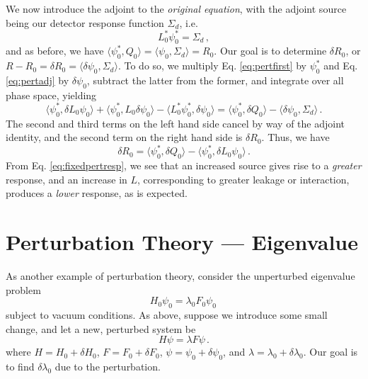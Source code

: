 We now introduce the adjoint to the \textit{original equation}, with the adjoint source being our detector response function $\Sigma_d$, i.e.
\begin{equation}
 L^*_0 \psi^*_0 = \Sigma_d \, ,
 \label{eq:pertadj}
\end{equation}
and as before, we have $\langle \psi^*_0, Q_0 \rangle =  \langle \psi_0, \Sigma_d \rangle = R_0$.  Our goal is to determine $\delta R_0$, or $R-R_0 = \delta R_0 =  \langle \delta \psi_0, \Sigma_d \rangle$.  To do so, we multiply Eq. \ref{eq:pertfirst} by $\psi^*_0$ and Eq. \ref{eq:pertadj} by $\delta \psi_0$, subtract the latter from the former, and integrate over all phase space, yielding
\begin{equation}
  \langle \psi^*_0, \delta L_0 \psi_0 \rangle + \langle \psi^*_0, L_0 \delta \psi_0 \rangle - \langle L^*_0 \psi^*_0, \delta \psi_0 \rangle = \langle \psi^*_0, \delta Q_0 \rangle - \langle \delta \psi_0, \Sigma_d \rangle \, .
\end{equation}
The second and third terms on the left hand side cancel by way of the adjoint identity, and the second term on the right hand side is $\delta R_0$.  Thus, we have
\begin{equation}
 \delta R_0 = \langle \psi^*_0, \delta Q_0 \rangle - \langle \psi^*_0, \delta L_0 \psi_0 \rangle \, .
 \label{eq:fixedpertresp}
\end{equation}
From Eq. \ref{eq:fixedpertresp}, we see that an increased source gives rise to a \textit{greater} response, and an increase in $L$, corresponding to greater leakage or interaction, produces a \textit{lower} response, as is expected.

\section*{Perturbation Theory --- Eigenvalue}

As another example of perturbation theory, consider the unperturbed eigenvalue problem
\begin{equation}
 H_0 \psi_0 = \lambda_0 F_0 \psi_0 \, 
\end{equation}
subject to vacuum conditions.  As above, suppose we introduce some small change, and let a new, perturbed system be
\begin{equation}
  H \psi = \lambda F \psi \, .
\end{equation}
where $H = H_0 + \delta H_0$, $F = F_0 + \delta F_0$, $\psi = \psi_0 + \delta \psi_0$, and $\lambda =\lambda_0 + \delta \lambda_0$.  Our goal is to find $\delta \lambda_0$ due to the perturbation.  

